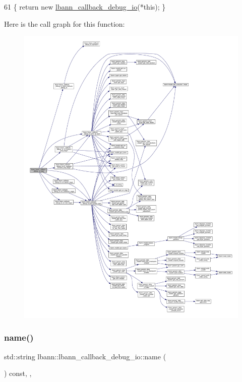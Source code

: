 \begin{DoxyCode}
61 \{ \textcolor{keywordflow}{return} \textcolor{keyword}{new} \hyperlink{classlbann_1_1lbann__callback__debug__io_a4103f7a133e2e7a8afe8744fc9345e2c}{lbann\_callback\_debug\_io}(*\textcolor{keyword}{this}); \}
\end{DoxyCode}
Here is the call graph for this function\+:\nopagebreak
\begin{figure}[H]
\begin{center}
\leavevmode
\includegraphics[width=350pt]{classlbann_1_1lbann__callback__debug__io_a91fb292d9dff96dbf72ecc16855c4092_cgraph}
\end{center}
\end{figure}
\mbox{\label{classlbann_1_1lbann__callback__debug__io_ae624010712365242688be8e55a566c62}} 
\subsubsection{\texorpdfstring{name()}{name()}}
{\footnotesize\ttfamily std\+::string lbann\+::lbann\+\_\+callback\+\_\+debug\+\_\+io\+::name (\begin{DoxyParamCaption}{ }\end{DoxyParamCaption}) const\hspace{0.3cm}{\ttfamily [inline]}, {\ttfamily [override]}, {\ttfamily [virtual]}}


